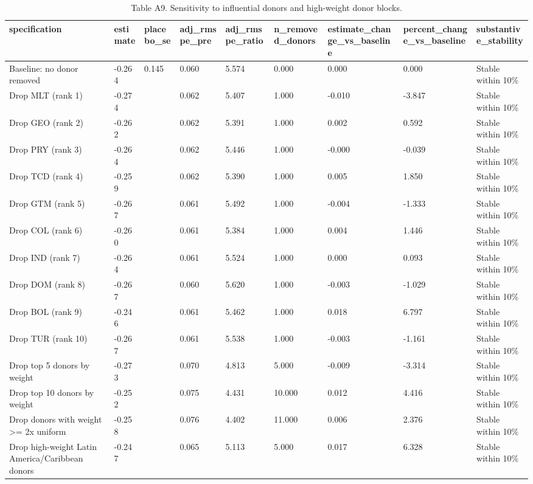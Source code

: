 \begin{table}

\caption{\label{tab:tab:sdid-donor-sensitivity}Table A9. Sensitivity to influential donors and high-weight donor blocks.}
\centering
\begin{tabular}[t]{lllllllll}
\toprule
specification & estimate & placebo\_se & adj\_rmspe\_pre & adj\_rmspe\_ratio & n\_removed\_donors & estimate\_change\_vs\_baseline & percent\_change\_vs\_baseline & substantive\_stability\\
\midrule
Baseline: no donor removed & -0.264 & 0.145 & 0.060 & 5.574 & 0.000 & 0.000 & 0.000 & Stable within 10\%\\
Drop MLT (rank 1) & -0.274 &  & 0.062 & 5.407 & 1.000 & -0.010 & -3.847 & Stable within 10\%\\
Drop GEO (rank 2) & -0.262 &  & 0.062 & 5.391 & 1.000 & 0.002 & 0.592 & Stable within 10\%\\
Drop PRY (rank 3) & -0.264 &  & 0.062 & 5.446 & 1.000 & -0.000 & -0.039 & Stable within 10\%\\
Drop TCD (rank 4) & -0.259 &  & 0.062 & 5.390 & 1.000 & 0.005 & 1.850 & Stable within 10\%\\
\addlinespace
Drop GTM (rank 5) & -0.267 &  & 0.061 & 5.492 & 1.000 & -0.004 & -1.333 & Stable within 10\%\\
Drop COL (rank 6) & -0.260 &  & 0.061 & 5.384 & 1.000 & 0.004 & 1.446 & Stable within 10\%\\
Drop IND (rank 7) & -0.264 &  & 0.061 & 5.524 & 1.000 & 0.000 & 0.093 & Stable within 10\%\\
Drop DOM (rank 8) & -0.267 &  & 0.060 & 5.620 & 1.000 & -0.003 & -1.029 & Stable within 10\%\\
Drop BOL (rank 9) & -0.246 &  & 0.061 & 5.462 & 1.000 & 0.018 & 6.797 & Stable within 10\%\\
\addlinespace
Drop TUR (rank 10) & -0.267 &  & 0.061 & 5.538 & 1.000 & -0.003 & -1.161 & Stable within 10\%\\
Drop top 5 donors by weight & -0.273 &  & 0.070 & 4.813 & 5.000 & -0.009 & -3.314 & Stable within 10\%\\
Drop top 10 donors by weight & -0.252 &  & 0.075 & 4.431 & 10.000 & 0.012 & 4.416 & Stable within 10\%\\
Drop donors with weight >= 2x uniform & -0.258 &  & 0.076 & 4.402 & 11.000 & 0.006 & 2.376 & Stable within 10\%\\
Drop high-weight Latin America/Caribbean donors & -0.247 &  & 0.065 & 5.113 & 5.000 & 0.017 & 6.328 & Stable within 10\%\\
\bottomrule
\end{tabular}
\end{table}
